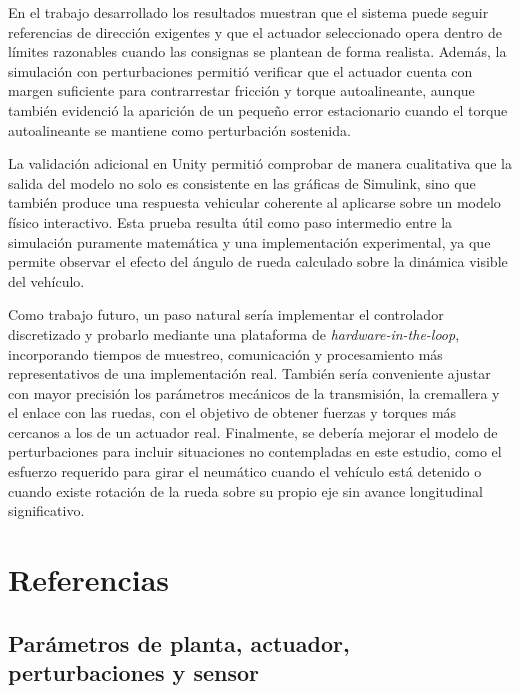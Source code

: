 \documentclass{article}
\begin{document}
En el trabajo desarrollado los resultados muestran que el sistema puede seguir referencias de dirección exigentes y que el actuador seleccionado opera dentro de límites razonables cuando las consignas se plantean de forma realista. Además, la simulación con perturbaciones permitió verificar que el actuador cuenta con margen suficiente para contrarrestar fricción y torque autoalineante, aunque también evidenció la aparición de un pequeño error estacionario cuando el torque autoalineante se mantiene como perturbación sostenida.

La validación adicional en Unity permitió comprobar de manera cualitativa que la salida del modelo no solo es consistente en las gráficas de Simulink, sino que también produce una respuesta vehicular coherente al aplicarse sobre un modelo físico interactivo. Esta prueba resulta útil como paso intermedio entre la simulación puramente matemática y una implementación experimental, ya que permite observar el efecto del ángulo de rueda calculado sobre la dinámica visible del vehículo.

Como trabajo futuro, un paso natural sería implementar el controlador discretizado y probarlo mediante una plataforma de \textit{hardware-in-the-loop}, incorporando tiempos de muestreo, comunicación y procesamiento más representativos de una implementación real. También sería conveniente ajustar con mayor precisión los parámetros mecánicos de la transmisión, la cremallera y el enlace con las ruedas, con el objetivo de obtener fuerzas y torques más cercanos a los de un actuador real. Finalmente, se debería mejorar el modelo de perturbaciones para incluir situaciones no contempladas en este estudio, como el esfuerzo requerido para girar el neumático cuando el vehículo está detenido o cuando existe rotación de la rueda sobre su propio eje sin avance longitudinal significativo.

\section*{Referencias}

\subsection*{Parámetros de planta, actuador, perturbaciones y sensor}
\end{document}
